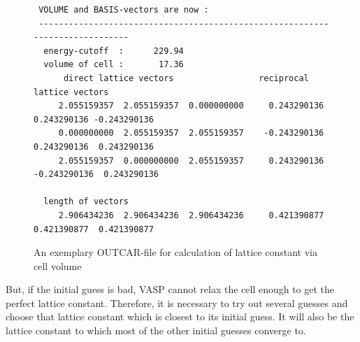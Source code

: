 \documentclass[twoside, 11pt, titlepage, captions=nooneline, a4paper, headsepline]{scrbook}%
\begin{document}
\begin{figure}[h!!]
\begin{verbatim}
 VOLUME and BASIS-vectors are now :
 -----------------------------------------------------------------------------
  energy-cutoff  :      229.94
  volume of cell :       17.36
      direct lattice vectors                 reciprocal lattice vectors
     2.055159357  2.055159357  0.000000000     0.243290136  0.243290136 -0.243290136
     0.000000000  2.055159357  2.055159357    -0.243290136  0.243290136  0.243290136
     2.055159357  0.000000000  2.055159357     0.243290136 -0.243290136  0.243290136

  length of vectors
     2.906434236  2.906434236  2.906434236     0.421390877  0.421390877  0.421390877

\end{verbatim}
\caption{An exemplary OUTCAR-file for calculation of lattice constant via cell volume}
\label{boutcar1}
\end{figure}
But, if the initial guess is bad, VASP cannot relax the cell enough to get the perfect lattice constant. Therefore, it is necessary to try out several guesses and choose that lattice constant which is closest to its initial guess. It will also be the lattice constant to which most of the other initial guesses converge to.\\
\end{document}

